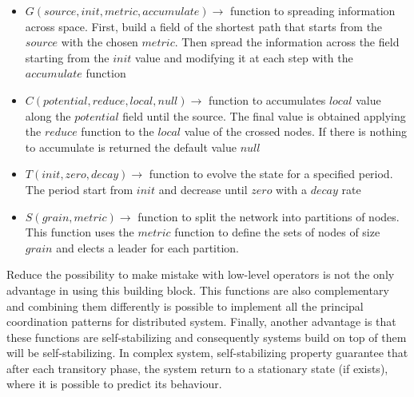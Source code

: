 \begin{itemize}
    \item $G(source, init, metric, accumulate) \rightarrow$ function to spreading information across space. First, build a field of the shortest path that starts from the $source$ with the chosen $metric$. Then spread the information across the field starting from the $init$ value and modifying it at each step with the $accumulate$ function
    \item $C(potential, reduce, local, null) \rightarrow$ function to accumulates $local$ value along the $potential$ field until the source. The final value is obtained applying the $reduce$ function to the $local$ value of the crossed nodes. If there is nothing to accumulate is returned the default value $null$
    \item $T(init, zero, decay)  \rightarrow$ function to evolve the state for a specified period. The period start from $init$ and decrease until $zero$ with a $decay$ rate
    \item $S(grain, metric)  \rightarrow$ function to split the network into partitions of nodes. This function uses the $metric$ function to define the sets of nodes of size $grain$ and elects a leader for each partition.
\end{itemize}

Reduce the possibility to make mistake with low-level operators is not the only advantage in using this building block.
This functions are also complementary and combining them differently is possible to implement all the principal coordination patterns for distributed system. Finally, another advantage is that these functions are self-stabilizing and consequently systems build on top of them will be self-stabilizing. In complex system, self-stabilizing property guarantee that after each transitory phase, the system return to a stationary state (if exists), where it is possible to predict its behaviour.


